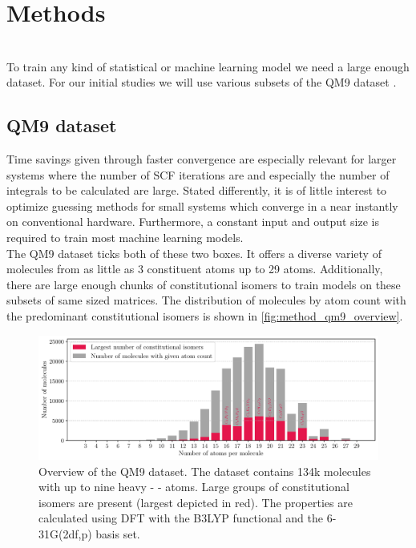 \chapter{Methods}
\label{chap:methods}
\\
To train any kind of statistical or machine learning model we need a large enough dataset. For our initial studies we will use various subsets of the QM9 dataset \parencite{ref:article1_qm9, ref:article2_qm9}. 

\section{QM9 dataset \parencite{ref:data_qm9}}
\label{sec:qm9}
Time savings given through faster convergence are especially relevant for larger systems where the number of SCF iterations are and especially the number of integrals to be calculated are large. Stated differently, it is of little interest to optimize guessing methods for small systems which converge in a near instantly on conventional hardware. Furthermore, a constant input and output size is required to train most machine learning models. \\
The QM9 dataset \parencite{ref:article1_qm9,ref:article2_qm9} ticks both of these two boxes. It offers a diverse variety of molecules from as little as 3 constituent atoms up to 29 atoms. Additionally, there are large enough chunks of constitutional isomers to train models on these subsets of same sized matrices. The distribution of molecules by atom count with the predominant constitutional isomers is shown in \autoref{fig:method_qm9_overview}.
\begin{figure}[H]
    \centering
    \includegraphics[width=\textwidth]{../fig/qm9_general/qm9_overview_stacked_bar.pdf}
    \caption[QM9 dataset overview]{Overview of the QM9 dataset. The dataset contains 134k molecules with up to nine heavy -     - atoms. Large groups of constitutional isomers are present (largest depicted in red). The properties are calculated using DFT with the B3LYP functional and the 6-31G(2df,p) basis set.}
    \label{fig:method_qm9_overview}
\end{figure}


